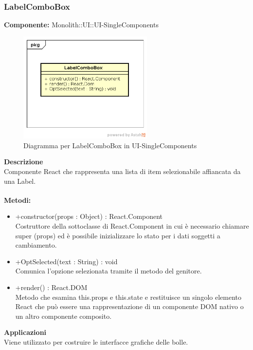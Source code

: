 \subsubsection{LabelComboBox}
\textbf{Componente:}  Monolith::UI::UI-SingleComponents\\
   \FloatBarrier
   \begin{figure}[ht]
   \centering
   \includegraphics[width=0.6\textwidth]{img/single-LabelComboBox}
   \caption{{Diagramma per LabelComboBox in UI-SingleComponents}}
\end{figure}
\FloatBarrier
\textbf{Descrizione}\\
Componente React che rappresenta una lista di item selezionabile affiancata da una Label. \\\\
\textbf{Metodi:} \begin{itemize}\item +constructor(props : Object) : React.Component \\Costruttore della sottoclasse di React.Component in cui è necessario chiamare super (props) ed è possibile inizializzare lo stato per i dati soggetti a cambiamento.\item +OptSelected(text : String) : void \\ Comunica l’opzione selezionata tramite il metodo del genitore. \item +render() : React.DOM \\Metodo che esamina this.props e this.state e restituisce un singolo elemento React che può essere una rappresentazione di un componente DOM nativo o un altro componente composito.\end{itemize} 


\textbf{Applicazioni}\\
Viene utilizzato per costruire le interfacce grafiche delle bolle. 


\clearpage

